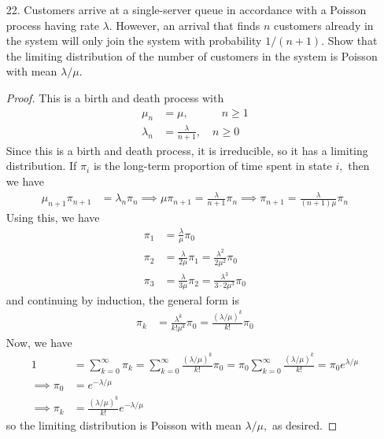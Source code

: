 \documentclass{article}
\begin{document}
\begin{itemize}
		\newpage
	\item[22.] Customers arrive at a single-server queue in accordance with a Poisson process having rate $\lambda.$ However, an arrival that finds $n$ customers already in the system will only join the system with probability $1/(n+1).$ Show that the limiting distribution of the number of customers in the system is Poisson with mean $\lambda/\mu.$
		\begin{proof}
			This is a birth and death process with
			\begin{align*}
				\mu_n &= \mu, \quad \quad \quad n\ge 1 \\
				\lambda_n &= \frac{\lambda}{n+1}, \quad n\ge 0
			\end{align*}
			Since this is a birth and death process, it is irreducible, so it has a limiting distribution. If $\pi_i$ is the long-term proportion of time spent in state $i,$ then we have
			\begin{align*}
				\mu_{n+1} \pi_{n+1} &= \lambda_n \pi_n \implies \mu \pi_{n+1} = \frac{\lambda}{n+1} \pi_n \implies \pi_{n+1} = \frac{\lambda}{(n+1)\mu} \pi_n
			\end{align*}
			Using this, we have
			\begin{align*}
				\pi_1 &= \frac{\lambda}{\mu} \pi_0 \\
				\pi_2 &= \frac{\lambda}{2\mu} \pi_1 = \frac{\lambda^2}{2\mu^2} \pi_0 \\
				\pi_3 &= \frac{\lambda}{3\mu} \pi_2 = \frac{\lambda^3}{3\cdot 2\mu^3} \pi_0
			\end{align*}
			and continuing by induction, the general form is 
			\begin{align*}
				\pi_k &= \frac{\lambda^k}{k! \mu^k} \pi_0 = \frac{(\lambda/\mu)^k}{k!} \pi_0
			\end{align*}
			Now, we have
			\begin{align*}
				1 &= \sum_{k=0}^{\infty} \pi_k = \sum_{k=0}^{\infty} \frac{(\lambda/\mu)^k}{k!} \pi_0 = \pi_0 \sum_{k=0}^{\infty} \frac{(\lambda/\mu)^k}{k!} = \pi_0 e^{\lambda/\mu} \\
				\implies \pi_0 &= e^{-\lambda/\mu} \\
				\implies \pi_k &= \frac{(\lambda/\mu)^k}{k!} e^{-\lambda/\mu}
			\end{align*}	
			so the limiting distribution is Poisson with mean $\lambda/\mu,$ as desired.
		\end{proof}
		
\end{itemize}
\end{document}
